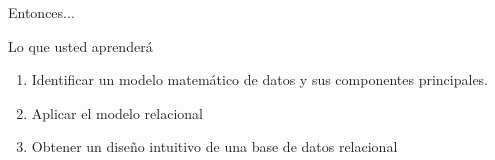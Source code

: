 \begin{frame}{Entonces...}

    \begin{block}{Lo que usted aprender\'a}
        \begin{enumerate}
            \item Identificar un modelo matem\'atico de datos y sus componentes principales.
            \item Aplicar el modelo relacional
            \item Obtener un dise\~no intuitivo de una base de datos relacional
        \end{enumerate}
        
    \end{block}
    
\end{frame}
